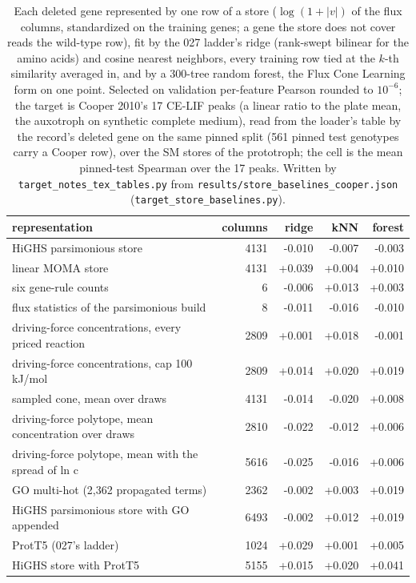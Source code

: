 \begin{table}[H]
  \centering
  \footnotesize
  \caption[CPU baselines over the store representations]{Each deleted gene represented by one row of a store ($\log(1+|v|)$ of the flux columns, standardized on the training genes; a gene the store does not cover reads the wild-type row), fit by the 027 ladder's ridge (rank-swept bilinear for the amino acids) and cosine nearest neighbors, every training row tied at the $k$-th similarity averaged in, and by a 300-tree random forest, the Flux Cone Learning form on one point. Selected on validation per-feature Pearson rounded to $10^{-6}$; the target is Cooper 2010's 17 CE-LIF peaks (a linear ratio to the plate mean, the auxotroph on synthetic complete medium), read from the loader's table by the record's deleted gene on the same pinned split (561 pinned test genotypes carry a Cooper row), over the SM stores of the prototroph; the cell is the mean pinned-test Spearman over the 17 peaks. Written by \texttt{target\_notes\_tex\_tables.py} from \texttt{results/store\_baselines\_cooper.json} (\texttt{target\_store\_baselines.py}).}
  \label{tab:store-baselines-cooper}
  \begin{tabular}{@{}lrrrr@{}}
    \hline
    representation & columns & ridge & kNN & forest \\
    \hline
    HiGHS parsimonious store & 4131 & -0.010 & -0.007 & -0.003 \\
    linear MOMA store & 4131 & +0.039 & +0.004 & +0.010 \\
    six gene-rule counts & 6 & -0.006 & +0.013 & +0.003 \\
    flux statistics of the parsimonious build & 8 & -0.011 & -0.016 & -0.010 \\
    driving-force concentrations, every priced reaction & 2809 & +0.001 & +0.018 & -0.001 \\
    driving-force concentrations, cap 100 kJ/mol & 2809 & +0.014 & +0.020 & +0.019 \\
    sampled cone, mean over draws & 4131 & -0.014 & -0.020 & +0.008 \\
    driving-force polytope, mean concentration over draws & 2810 & -0.022 & -0.012 & +0.006 \\
    driving-force polytope, mean with the spread of ln c & 5616 & -0.025 & -0.016 & +0.006 \\
    GO multi-hot (2,362 propagated terms) & 2362 & -0.002 & +0.003 & +0.019 \\
    HiGHS parsimonious store with GO appended & 6493 & -0.002 & +0.012 & +0.019 \\
    ProtT5 (027's ladder) & 1024 & +0.029 & +0.001 & +0.005 \\
    HiGHS store with ProtT5 & 5155 & +0.015 & +0.020 & +0.041 \\
    \hline
  \end{tabular}
\end{table}
